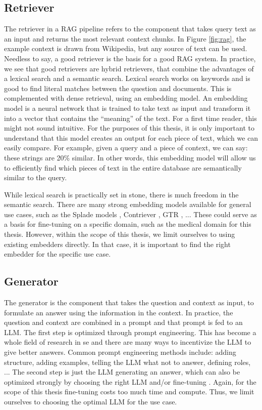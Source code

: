 \subsection{Retriever}
The retriever in a RAG pipeline refers to the component that takes query text as an input and returns the most relevant context chunks. In Figure \ref{fig:rag}, the example context is drawn from Wikipedia, but any source of text can be used. Needless to say, a good retriever is the basis for a good RAG system. In practice, we see that good retrievers are hybrid retrievers, that combine the advantages of a lexical search and a semantic search. Lexical search works on keywords and is good to find literal matches between the question and documents. This is complemented with dense retrieval, using an embedding model. An embedding model is a neural network that is trained to take text as input and transform it into a vector that contains the ``meaning'' of the text. For a first time reader, this might not sound intuitive. For the purposes of this thesis, it is only important to understand that this model creates an output for each piece of text, which we can easily compare. For example, given a query and a piece of context, we can say: these strings are 20\% similar. In other words, this embedding model will allow us to efficiently find which pieces of text in the entire database are semantically similar to the query. 

While lexical search is practically set in stone, there is much freedom in the semantic search. There are many strong embedding models available for general use cases, such as the Splade models \cite{formal2021splade, formal2021spladev2, lassance2024spladev3}, Contriever \cite{izacard2021unsupervisedcontriever}, GTR \cite{ni2021largegtr}, ... These could serve as a basis for fine-tuning on a specific domain, such as the medical domain for this thesis. However, within the scope of this thesis, we limit ourselves to using existing embedders directly. In that case, it is important to find the right embedder for the specific use case.

\subsection{Generator}
The generator is the component that takes the question and context as input, to formulate an answer using the information in the context. In practice, the question and context are combined in a prompt and that prompt is fed to an LLM. The first step is optimized through prompt engineering. This has become a whole field of research in se and there are many ways to incentivize the LLM to give better answers. Common prompt engineering methods include: adding structure, adding examples, telling the LLM what not to answer, defining roles, ... \cite{brown2020language, chen2023unleashing, white2023prompt} The second step is just the LLM generating an answer, which can also be optimized strongly by choosing the right LLM and/or fine-tuning \cite{han2024parameter, xu2023parameter}. Again, for the scope of this thesis fine-tuning costs too much time and compute. Thus, we limit ourselves to choosing the optimal LLM for the use case.

